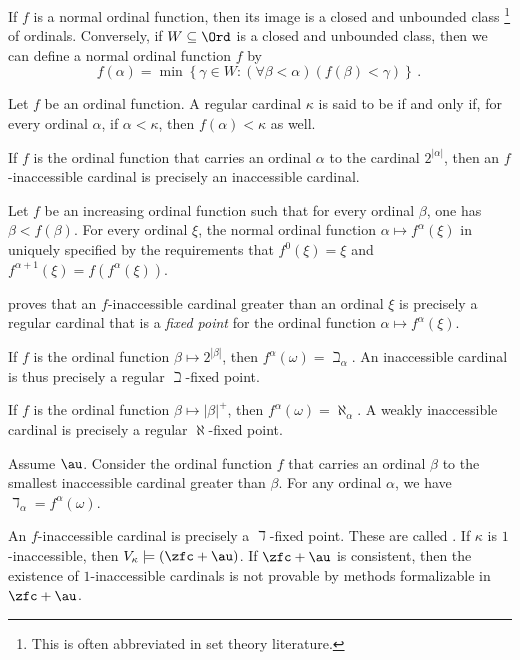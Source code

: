 \begin{nul}
	If $ f $ is a normal ordinal function,
	then its image is a closed and unbounded class%
	\footnote{This is often abbreviated  in
	set theory literature.}
	of ordinals.
	Conversely, if $ W \subseteq \Ord $ is a closed and unbounded class,
	then we can define a normal ordinal function $ f $ by
	\[
		f(\alpha) =
		\min \left\{ \gamma \in W :
			(\forall \beta < \alpha)(f(\beta) < \gamma) \right\} \period
	\]
\end{nul}

\begin{definition}
	Let $ f $ be an ordinal function.
	A regular cardinal $ \kappa $ is said to be
	 if and only if,
	for every ordinal $ \alpha$, if $ \alpha < \kappa $,
	then $ f(\alpha) < \kappa $ as well.
\end{definition}

\begin{eg}
	If $ f $ is the ordinal function that carries
	an ordinal $ \alpha $ to the cardinal $ 2^{|\alpha|} $,
	then an $ f $-inaccessible cardinal is precisely
	an inaccessible cardinal.
\end{eg}

\begin{construction}
	Let $ f $ be an increasing ordinal function
	such that for every ordinal $ \beta $, one has $ \beta < f(\beta) $.
	For every ordinal $ \xi $,
	the normal ordinal function $ \alpha \mapsto f^{\alpha}(\xi) $
	in uniquely specified by the requirements that
	$ f^0(\xi) = \xi $ and $ f^{\alpha + 1}(\xi) =f(f^{\alpha}(\xi)) $.

	\cite{Jorgensen1970} proves that an $ f $-inaccessible cardinal
	greater than an ordinal $ \xi $
	is precisely a regular cardinal that is a \emph{fixed point}
	for the ordinal function $ \alpha \mapsto f^{\alpha}(\xi) $.
\end{construction}

\begin{eg}
	If $ f $ is the ordinal function $ \beta \mapsto 2^{|\beta|} $,
	then $ f^{\alpha}(\omega) = \beth_{\alpha} $.
	An inaccessible cardinal is thus precisely a regular $ \beth $-fixed point.
	
	If $ f $ is the ordinal function $ \beta \mapsto |\beta|^+ $,
	then $ f^{\alpha}(\omega) = \aleph_{\alpha} $. 
	A weakly inaccessible cardinal is precisely a regular $ \aleph $-fixed  point.
\end{eg}

\begin{eg}
	Assume $ \au $.
	Consider the ordinal function $ f $ that carries
	an ordinal $ \beta $ to the smallest inaccessible cardinal greater than $ \beta $.
	For any ordinal $ \alpha $,
	we have $ \daleth_{\alpha} = f^{\alpha}(\omega) $.

	An $ f $-inaccessible cardinal is precisely a $ \daleth $-fixed point.
	These are called .
	If $ \kappa $ is $ 1 $-inaccessible, then
	$ V_{\kappa} \models (\zfc + \au) $.
	If $ \zfc + \au $ is consistent, then
	the existence of $ 1 $-inaccessible cardinals is not provable
	by methods formalizable in $ \zfc + \au $.
\end{eg}

